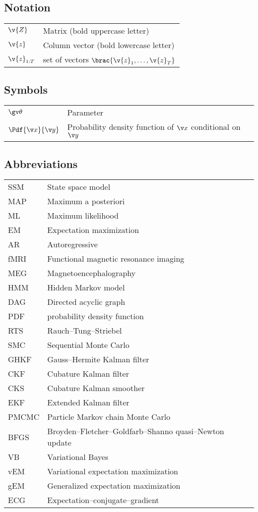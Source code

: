 \subsection*{Notation}
\begin{tabular}{ll}
$\v{Z}$  & Matrix (bold uppercase letter)  \\
$\v{z}$ & Column vector (bold lowercase letter) \\
$\v{z}_{1:T}$    & set of vectors $\brac{\v{z}_1,\dots,\v{z}_T}$
\end{tabular}


\subsection*{Symbols}

\begin{tabular}{ll}
$\Th$            & Parameter\\
$\Pdf{\x}{\y}$   & Probability density function of $\x$ conditional on $\y$
\end{tabular}

\subsection*{Abbreviations}

\begin{tabular}{ll}
SSM & State space model \\
MAP & Maximum a posteriori \\
ML & Maximum likelihood \\
EM & Expectation maximization \\
AR & Autoregressive \\
fMRI & Functional magnetic resonance imaging \\
MEG & Magnetoencephalography \\
HMM & Hidden Markov model \\
DAG & Directed acyclic graph \\
PDF & probability density function \\
RTS & Rauch--Tung--Striebel \\
SMC & Sequential Monte Carlo \\
GHKF & Gauss--Hermite Kalman filter \\
CKF & Cubature Kalman filter \\
CKS & Cubature Kalman smoother \\
EKF & Extended Kalman filter \\
PMCMC & Particle Markov chain Monte Carlo \\
BFGS & Broyden--Fletcher--Goldfarb--Shanno quasi--Newton update\\
VB & Variational Bayes \\
vEM & Variational expectation maximization \\
gEM & Generalized expectation maximization \\
ECG & Expectation--conjugate--gradient
\end{tabular}